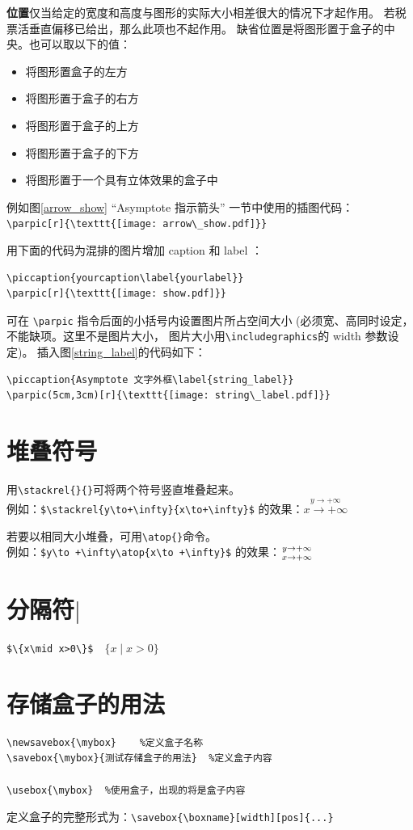 \documentclass[a4paper,11pt]{article}
\begin{document}
{\bf 位置}仅当给定的宽度和高度与图形的实际大小相差很大的情况下才起作用。
若税票活垂直偏移已给出，那么此项也不起作用。
缺省位置是将图形置于盒子的中央。也可以取以下的值：
\begin{itemize}
	\item [l] 将图形置盒子的左方
	\item [r] 将图形置于盒子的右方
	\item [t] 将图形置于盒子的上方
	\item [b] 将图形置于盒子的下方
	\item [x] 将图形置于一个具有立体效果的盒子中	
\end{itemize}
例如图\ref{arrow_show} ``Asymptote 指示箭头'' 一节中使用的插图代码：\\
\verb+\parpic[r]{\texttt{[image: arrow\_show.pdf]}}+

用下面的代码为混排的图片增加 caption 和 label ：
\begin{Verbatim}
\piccaption{yourcaption\label{yourlabel}}
\parpic[r]{\texttt{[image: show.pdf]}}
\end{Verbatim}

可在 \verb+\parpic+ 指令后面的小括号内设置图片所占空间大小%
(必须宽、高同时设定，不能缺项。这里不是图片大小，
图片大小用\verb+\includegraphics+的 width 参数设定)。
插入图\ref{string_label}的代码如下：
\begin{Verbatim}
\piccaption{Asymptote 文字外框\label{string_label}}
\parpic(5cm,3cm)[r]{\texttt{[image: string\_label.pdf]}}
\end{Verbatim}

\section{堆叠符号}
用\verb+\stackrel{}{}+可将两个符号竖直堆叠起来。\\
例如：\verb|$\stackrel{y\to+\infty}{x\to+\infty}$|
的效果：$\stackrel{y\to +\infty}{x\to +\infty}$

若要以相同大小堆叠，可用\verb+\atop{}+命令。\\
例如：\verb|$y\to +\infty\atop{x\to +\infty}$|
的效果：$y\to +\infty\atop{x\to +\infty}$

\section{分隔符$\mid$}
\verb+$\{x\mid x>0\}$+$\quad\{x\mid x>0\}$

\section{存储盒子的用法}
\begin{Verbatim}
\newsavebox{\mybox}    %定义盒子名称
\savebox{\mybox}{测试存储盒子的用法}  %定义盒子内容

\usebox{\mybox}  %使用盒子，出现的将是盒子内容
\end{Verbatim}
定义盒子的完整形式为：\verb+\savebox{\boxname}[width][pos]{...}+
\end{document}
